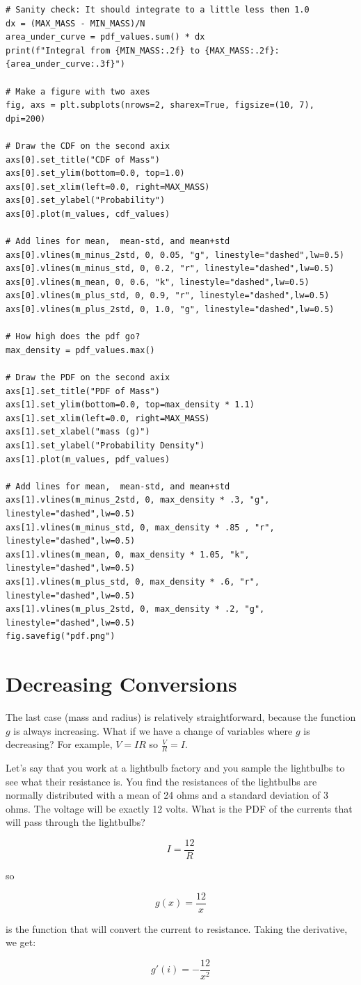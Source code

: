 \begin{verbatim}
# Sanity check: It should integrate to a little less then 1.0
dx = (MAX_MASS - MIN_MASS)/N
area_under_curve = pdf_values.sum() * dx
print(f"Integral from {MIN_MASS:.2f} to {MAX_MASS:.2f}: {area_under_curve:.3f}")

# Make a figure with two axes
fig, axs = plt.subplots(nrows=2, sharex=True, figsize=(10, 7), dpi=200)

# Draw the CDF on the second axix
axs[0].set_title("CDF of Mass")
axs[0].set_ylim(bottom=0.0, top=1.0)
axs[0].set_xlim(left=0.0, right=MAX_MASS)
axs[0].set_ylabel("Probability")
axs[0].plot(m_values, cdf_values)

# Add lines for mean,  mean-std, and mean+std
axs[0].vlines(m_minus_2std, 0, 0.05, "g", linestyle="dashed",lw=0.5)
axs[0].vlines(m_minus_std, 0, 0.2, "r", linestyle="dashed",lw=0.5)
axs[0].vlines(m_mean, 0, 0.6, "k", linestyle="dashed",lw=0.5)
axs[0].vlines(m_plus_std, 0, 0.9, "r", linestyle="dashed",lw=0.5)
axs[0].vlines(m_plus_2std, 0, 1.0, "g", linestyle="dashed",lw=0.5)

# How high does the pdf go?
max_density = pdf_values.max()

# Draw the PDF on the second axix
axs[1].set_title("PDF of Mass")
axs[1].set_ylim(bottom=0.0, top=max_density * 1.1)
axs[1].set_xlim(left=0.0, right=MAX_MASS)
axs[1].set_xlabel("mass (g)")
axs[1].set_ylabel("Probability Density")
axs[1].plot(m_values, pdf_values)

# Add lines for mean,  mean-std, and mean+std
axs[1].vlines(m_minus_2std, 0, max_density * .3, "g", linestyle="dashed",lw=0.5)
axs[1].vlines(m_minus_std, 0, max_density * .85 , "r", linestyle="dashed",lw=0.5)
axs[1].vlines(m_mean, 0, max_density * 1.05, "k", linestyle="dashed",lw=0.5)
axs[1].vlines(m_plus_std, 0, max_density * .6, "r", linestyle="dashed",lw=0.5)
axs[1].vlines(m_plus_2std, 0, max_density * .2, "g", linestyle="dashed",lw=0.5)
fig.savefig("pdf.png")
\end{verbatim}

\section{Decreasing Conversions}

The last case (mass and radius) is relatively straightforward, because the function $g$ is always increasing.  What if we have a change of variables where 
$g$ is decreasing? For example,  $V= IR$ so $\frac{V}{R} = I$.

Let's say that you work at a lightbulb factory and you sample the lightbulbs to see what their resistance is.  You find the resistances of the lightbulbs are normally distributed with a mean of 24 ohms and a standard deviation of 3 ohms.  The voltage will be exactly 12 volts.  What is the PDF of the currents that will pass through the lightbulbs?

$$I = \frac{12}{R}$$

so 

$$g(x) = \frac{12}{x}$$

is the function that will convert the current to resistance.  Taking the derivative,  we get:

$$g'(i) = -\frac{12}{x^2}$$










